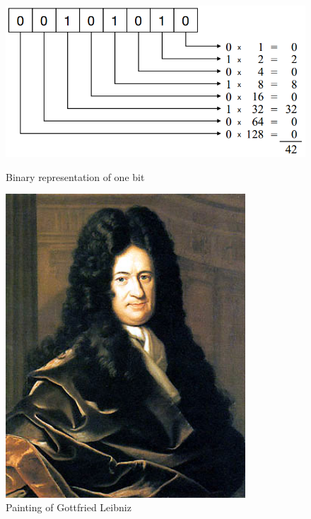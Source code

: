 \documentclass[11pt]{article}
\begin{document}
\begin{figure}[H]
\centering
\begin{minipage}{0.5\textwidth}
  \includegraphics[width=1\textwidth]{binary.png}%
  \caption{Binary representation of one bit}%
  \label{fig:binary}
\end{minipage}%
\begin{minipage}{.4\textwidth}
  \centering
  \includegraphics[width=0.8\textwidth]{leibniz}%
  \caption{Painting of Gottfried Leibniz}%
  \label{fig:leibniz}
\end{minipage}
\end{figure}
\end{document}
